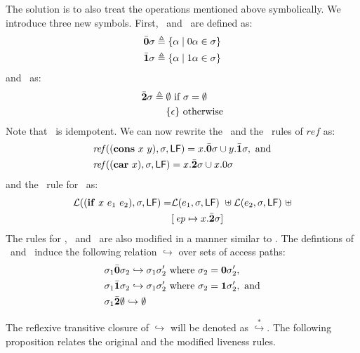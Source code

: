 \documentclass[9pt]{sigplanconf}
\begin{document}
The  solution  is  to   also  treat  the  operations  mentioned  above
symbolically.  We  introduce three  new  symbols.   First, \bcar\  and
\bcdr\ are defined as:
\begin{align*}
 \bar{\mathbf{0}}\sigma &\triangleq \{\alpha \mid 0\alpha \in \sigma\}\\
 \bar{\mathbf{1}}\sigma &\triangleq \{\alpha \mid 1\alpha \in \sigma\}
\end{align*}
and \cbar\ as:
\begin{align*}
 \bar{\mathbf{2}}\sigma \triangleq\; & \emptyset~\mbox{if}~\sigma = \emptyset\\
                       & \{\epsilon\} ~\mbox{otherwise}
\end{align*}
Note that \cbar\ is idempotent. 
We can now rewrite the \CONS\ and the \CAR\ rules of $\mathit{ref}$ as:
\begin{align*}
&\mathit{ref\/}((\mbox{$\mathbf{cons}$}~x~y),\sigma,\mathsf{LF})
= x.\bar{\mathbf{0}}\sigma \cup y.\bar{\mathbf{1}}\sigma  \label{eqn:mod-cons},~
\mbox{and} \\
&\mathit{ref\/}((\mbox{$\mathbf{car}$}~x),\sigma,\mathsf{LF})
          =   x.\bar{\mathbf{2}}\sigma \cup x.0\sigma
\end{align*}
and the \Lfunonly\ rule
for \SIF\ as:
\begin{align*}
\mathcal{L}((\mbox{$\mathbf{ if}$}~x~e_1~e_2),\sigma,\mathsf{LF}) =
                    &\mathcal{L}(e_1,\sigma,\mathsf{LF})~\uplus
        \mathcal{L}(e_2,\sigma,\mathsf{LF})~\uplus\\
        &[\,\mathit{ep} \mapsto  x.\bar{\mathbf{2}} \sigma]
\end{align*}
The rules for \CDR, \PRIM\ and  \NULLQ\  are also modified in a manner
similar to \CAR.
The  defintions of \bcar\, \bcdr\ and \cbar\  induce   the  following
relation $\hookrightarrow$ over sets of access paths:
\begin{align*}
  &\sigma_1\bar{\mathbf{0}}\sigma_2  \hookrightarrow
  \sigma_1\sigma_2'\mbox{ where } \sigma_2 = \mathbf{0}\sigma_2',\\
&\sigma_1\bar{\mathbf{1}}\sigma_2  \hookrightarrow
  \sigma_1\sigma_2'\mbox{ where } \sigma_2 =
  \mathbf{1}\sigma_2',~\mbox{and}\\
&\sigma_1\bar{\mathbf{2}} \emptyset \hookrightarrow \emptyset
\end{align*}


The reflexive  transitive closure of  $\hookrightarrow$ will
be   denoted    as   $\stackrel{*}{\hookrightarrow}$.    The
following proposition relates  the original and the modified
liveness rules.
\end{document}
